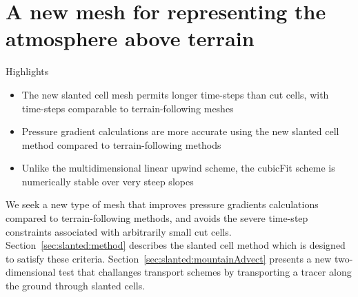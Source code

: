 \chapter{A new mesh for representing the atmosphere above terrain}
\label{ch:slanted}

\begin{highlights}
{\Large Highlights}
\begin{itemize}
	\item The new slanted cell mesh permits longer time-steps than cut cells, with time-steps comparable to terrain-following meshes
	\item Pressure gradient calculations are more accurate using the new slanted cell method compared to terrain-following methods
	\item Unlike the multidimensional linear upwind scheme, the cubicFit scheme is numerically stable over very steep slopes
\end{itemize}
\end{highlights}


We seek a new type of mesh that improves pressure gradients calculations compared to terrain-following methods, and avoids the severe time-step constraints associated with arbitrarily small cut cells.  Section~\ref{sec:slanted:method} describes the slanted cell method which is designed to satisfy these criteria.
Section~\ref{sec:slanted:mountainAdvect} presents a new two-dimensional test that challanges transport schemes by transporting a tracer along the ground through slanted cells.





